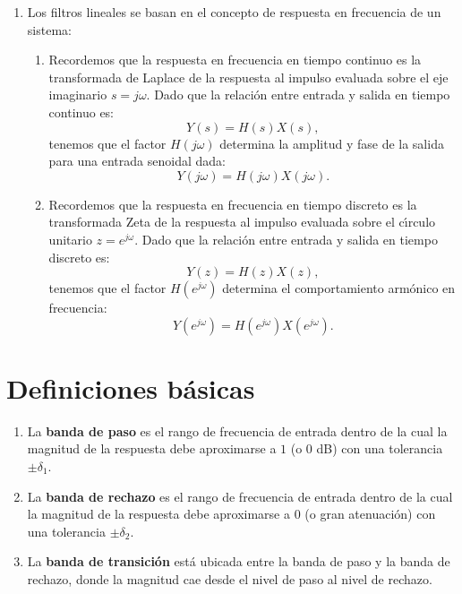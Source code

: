 \begin{enumerate}
	\item Los filtros lineales se basan en el concepto de respuesta en frecuencia de un sistema: 
	\begin{enumerate}
		\item Recordemos que la respuesta en frecuencia en tiempo continuo es la transformada de Laplace de la respuesta al impulso evaluada sobre el eje imaginario $s = j \omega$. Dado que la relaci\'{o}n entre entrada y salida en tiempo continuo es:
		\begin{equation}
			Y(s) = H(s) X(s),
		\end{equation}
		tenemos que el factor $H( j \omega)$ determina la amplitud y fase de la salida para una entrada senoidal dada:
		\begin{equation}
			Y(j \omega) = H(j \omega) X(j \omega).
		\end{equation}
		
		\item Recordemos que la respuesta en frecuencia en tiempo discreto es la transformada Zeta de la respuesta al impulso evaluada sobre el c\'{\i}rculo unitario $z = e^{j \omega}$. Dado que la relaci\'{o}n entre entrada y salida en tiempo discreto es:
		\begin{equation}
			Y(z) = H(z) X(z),
		\end{equation}
		tenemos que el factor $H(e^{j \omega})$ determina el comportamiento armónico en frecuencia:
		\begin{equation}
			Y(e^{j \omega}) = H(e^{j \omega}) X(e^{j \omega}).
		\end{equation}
	\end{enumerate}
	
\end{enumerate}

\section{Definiciones b\'{a}sicas}

\begin{enumerate}
	\item La \textbf{banda de paso} es el rango de frecuencia de entrada dentro de la cual la magnitud de la respuesta debe aproximarse a $1$ (o $0$ dB) con una tolerancia $\pm \delta _{1}.$
	\item La \textbf{banda de rechazo} es el rango de frecuencia de entrada dentro de la cual la magnitud de la respuesta debe aproximarse a $0$ (o gran atenuación) con una tolerancia $\pm \delta _{2}.$
	\item La \textbf{banda de transici\'{o}n} est\'{a} ubicada entre la banda de paso y la banda de rechazo, donde la magnitud cae desde el nivel de paso al nivel de rechazo.
\end{enumerate}

